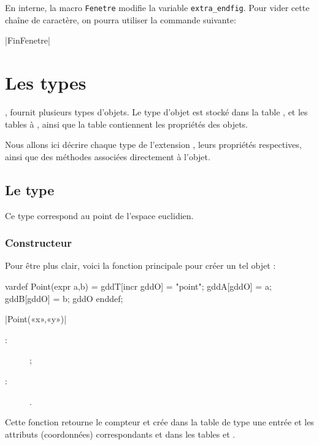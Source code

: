 \documentclass[a4paper,french]{article}
\begin{document}
En interne, la macro \lstinline|Fenetre| modifie la variable 
\lstinline+extra_endfig+. Pour vider cette chaîne de caractère, on pourra
utiliser la commande suivante:
\begin{colourband}
\macro|FinFenetre|
\end{colourband}

\section{Les types}\label{sec:types}

\mpgeomdd, fournit plusieurs types d'objets. Le type d'objet est
stocké dans la table , et les tables 
à , ainsi que la table  contiennent les propriétés des objets.

Nous allons ici décrire chaque type de l'extension \mpgeomdd,
leurs propriétés respectives, ainsi que des méthodes associées directement à
l'objet.

\subsection{Le type }

Ce type correspond au point de
l'espace euclidien.

\subsubsection{Constructeur}

Pour être plus clair, voici la fonction principale
pour créer un tel objet :
%
\begin{mpcode}
vardef Point(expr a,b) =
  gddT[incr gddO] = "point";
  gddA[gddO] = a; gddB[gddO] = b; gddO
enddef;
\end{mpcode}

\begin{colourband}
\macro|Point(«x»,«y»)|
\begin{description}
  \item[:]  ;
  \item[:] .
\end{description}
\end{colourband}
\bigskip


Cette fonction \og{}retourne\fg{} le compteur  et crée dans la
table de type une entrée  et les attributs (coordonnées)
correspondants  et  dans les tables
 et .
\end{document}
